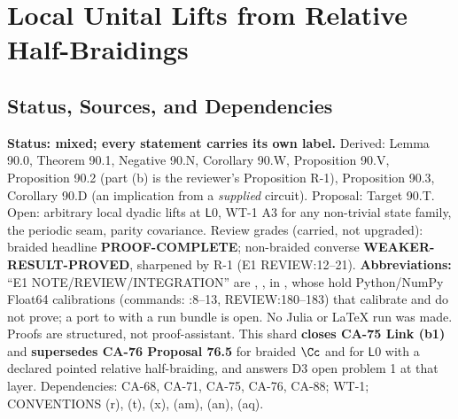 
\section{Local Unital Lifts from Relative Half-Braidings}
\label{sec:local-unital-lift}

\subsection{Status, Sources, and Dependencies}

\textbf{Status: mixed; every statement carries its own label.}  Derived: Lemma 90.0, Theorem 90.1, Negative 90.N, Corollary
90.W, Proposition 90.V, Proposition 90.2 (part (b) is the reviewer's Proposition R-1), Proposition 90.3, Corollary 90.D (an
implication from a \emph{supplied} circuit).  Proposal: Target 90.T.  Open: arbitrary local dyadic lifts at \(\mathsf L0\),
WT-1 A3 for any non-trivial state family, the periodic seam, parity covariance.  Review grades (carried, not upgraded):
braided headline \textbf{PROOF-COMPLETE}; non-braided converse \textbf{WEAKER-RESULT-PROVED}, sharpened by R-1 (E1
REVIEW:12--21).  \textbf{Abbreviations:} ``E1 NOTE/REVIEW/INTEGRATION'' are , ,
 in , whose  hold Python/NumPy
Float64 calibrations (commands: :8--13, REVIEW:180--183) that calibrate and do not prove; a port to
 with a run bundle is open.  No Julia or \LaTeX{} run was made.  Proofs are structured, not proof-assistant.
This shard \textbf{closes CA-75 Link (b1)} and \textbf{supersedes CA-76 Proposal 76.5} for braided \(\Cc\) and for
\(\mathsf L0\) with a declared pointed relative half-braiding, and answers D3 open problem 1 at that layer.
Dependencies: CA-68, CA-71, CA-75, CA-76, CA-88; WT-1; CONVENTIONS (r), (t), (x), (am), (an), (aq).

